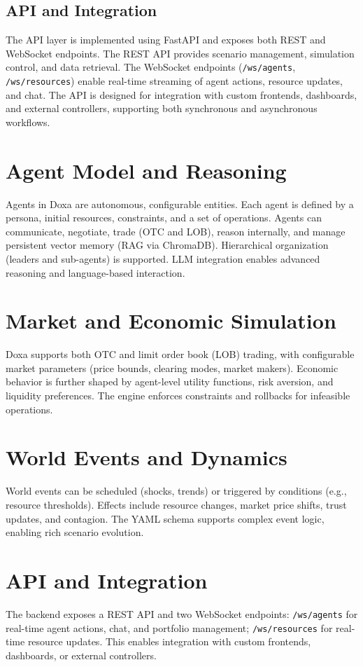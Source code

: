\documentclass{article}
\begin{document}
\subsection{API and Integration}
The API layer is implemented using FastAPI and exposes both REST and WebSocket endpoints. The REST API provides scenario management, simulation control, and data retrieval. The WebSocket endpoints (\texttt{/ws/agents}, \texttt{/ws/resources}) enable real-time streaming of agent actions, resource updates, and chat. The API is designed for integration with custom frontends, dashboards, and external controllers, supporting both synchronous and asynchronous workflows.

\section{Agent Model and Reasoning}
Agents in Doxa are autonomous, configurable entities. Each agent is defined by a persona, initial resources, constraints, and a set of operations. Agents can communicate, negotiate, trade (OTC and LOB), reason internally, and manage persistent vector memory (RAG via ChromaDB). Hierarchical organization (leaders and sub-agents) is supported. LLM integration enables advanced reasoning and language-based interaction.

\section{Market and Economic Simulation}
Doxa supports both OTC and limit order book (LOB) trading, with configurable market parameters (price bounds, clearing modes, market makers). Economic behavior is further shaped by agent-level utility functions, risk aversion, and liquidity preferences. The engine enforces constraints and rollbacks for infeasible operations.

\section{World Events and Dynamics}
World events can be scheduled (shocks, trends) or triggered by conditions (e.g., resource thresholds). Effects include resource changes, market price shifts, trust updates, and contagion. The YAML schema supports complex event logic, enabling rich scenario evolution.

\section{API and Integration}
The backend exposes a REST API and two WebSocket endpoints:\newline
\texttt{/ws/agents} for real-time agent actions, chat, and portfolio management;\newline
\texttt{/ws/resources} for real-time resource updates. This enables integration with custom frontends, dashboards, or external controllers.
\end{document}
